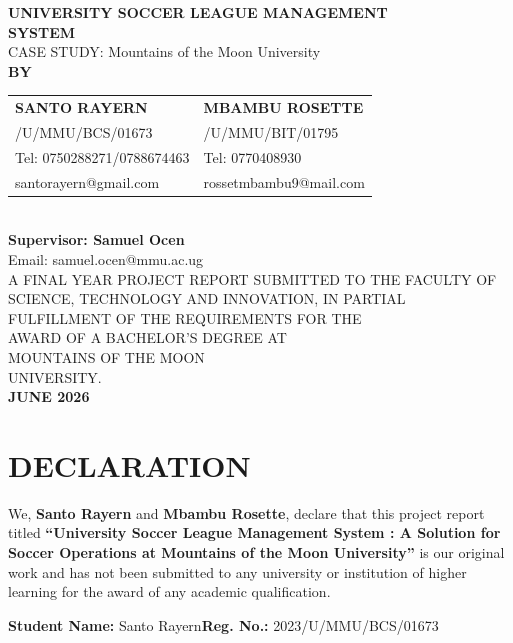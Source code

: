 \documentclass[12pt,a4paper]{report}
\begin{document}
\begin{titlepage}\thispagestyle{empty}\centering\vspace*{0.6cm}
{\Large\bfseries UNIVERSITY SOCCER LEAGUE MANAGEMENT\\ SYSTEM}\\[0.7cm]
{\large CASE STUDY: Mountains of the Moon University}\\[1.6cm]
{\large\bfseries BY}\\[1cm]
\begin{tabular}{p{}p{}}
\centering\textbf{SANTO RAYERN} & \centering\textbf{MBAMBU ROSETTE}\tabularnewline
\centering 2023/U/MMU/BCS/01673 & \centering 2023/U/MMU/BIT/01795\tabularnewline
\centering Tel: 0750288271/0788674463 & \centering Tel: 0770408930\tabularnewline
\centering santorayern@gmail.com & \centering rossetmbambu9@mail.com\tabularnewline
\end{tabular}\\[1.2cm]
{\large\bfseries Supervisor: Samuel Ocen}\\
{\large Email: samuel.ocen@mmu.ac.ug}\\[1.4cm]
{\large A FINAL YEAR PROJECT REPORT SUBMITTED TO THE FACULTY OF SCIENCE, TECHNOLOGY AND INNOVATION,
IN PARTIAL FULFILLMENT OF THE REQUIREMENTS FOR THE\\ AWARD OF A BACHELOR'S DEGREE AT
\\MOUNTAINS OF THE MOON \\UNIVERSITY.}\\[1.5cm]
{\large\bfseries JUNE 2026}
\end{titlepage}
\newpage\chapter*{DECLARATION}
We, \textbf{Santo Rayern} and \textbf{Mbambu Rosette}, declare that this project report titled
\textbf{``University Soccer League Management System : A Solution
for Soccer Operations at Mountains of the Moon University''} is our original work and has not been
submitted to any university or institution of higher learning for the award of any academic qualification.
\vspace{1.4cm}

\textbf{Student Name:} Santo Rayern\hfill\textbf{Reg. No.:} 2023/U/MMU/BCS/01673
\end{document}
